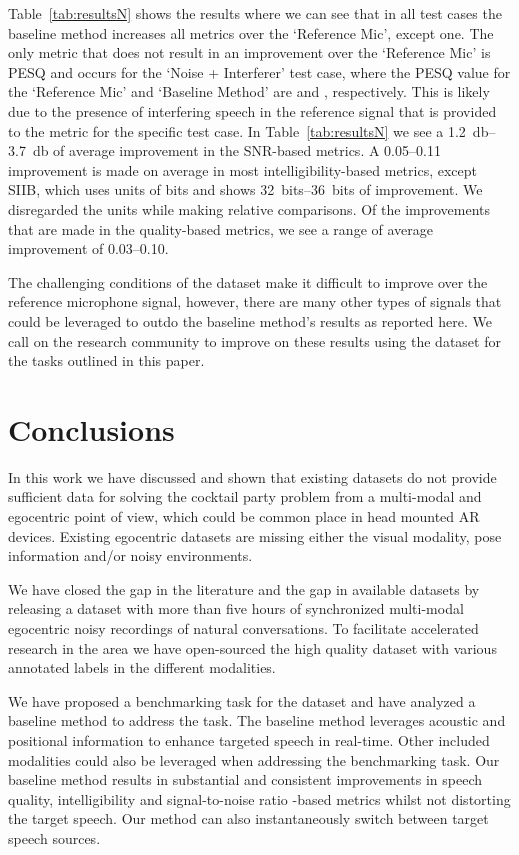 \documentclass[journal]{IEEEtran}
\begin{document}
\begin{table*}[htb!]
\begin{center}
\begin{tabular}
{{Table~\ref{tab:resultsN} shows the results where we can see that in all test cases the baseline method increases all metrics over the `Reference Mic', except one.
The only metric that does not result in an improvement over the `Reference Mic' is PESQ and occurs for the `Noise + Interferer' test case, where the PESQ value for the `Reference Mic' and `Baseline Method' are  and , respectively.
This is likely due to the presence of interfering speech in the reference signal that is provided to the metric for the specific test case.
In Table~\ref{tab:resultsN} we see a \SIrange{1.2}{3.7}{\decibel} of average improvement in the SNR-based metrics.
A \SIrange{0.05}{0.11}{} improvement is made on average in most intelligibility-based metrics, except SIIB, which uses units of bits and shows \SIrange{32}{36}{bits} of improvement. We disregarded the units while making relative comparisons.
Of the improvements that are made in the quality-based metrics, we see a range of average improvement of \SIrange{0.03}{0.10}{}.

The challenging conditions of the dataset make it difficult to improve over the reference microphone signal, however, there are many other types of signals that could be leveraged to outdo the baseline method's results as reported here.
We call on the research community to improve on these results using the dataset for the tasks outlined in this paper.

 

\section{Conclusions} \label{sec:Conclusions}
In this work we have discussed and shown that existing datasets do not provide sufficient data for solving the cocktail party problem from a multi-modal and egocentric point of view, which could be common place in head mounted AR devices.
Existing egocentric datasets are missing either the visual modality, pose information and/or noisy environments.

We have closed the gap in the literature and the gap in available datasets by releasing a dataset with more than five hours of synchronized multi-modal egocentric noisy recordings of natural conversations.
To facilitate accelerated research in the area we have open-sourced the high quality dataset with various annotated labels in the different modalities.


We have proposed a benchmarking task for the dataset and have analyzed a baseline method to address the task.
The baseline method leverages acoustic and positional information to enhance targeted speech in real-time.
Other included modalities could also be leveraged when addressing the benchmarking task.
Our baseline method results in substantial and consistent improvements in speech quality, intelligibility and signal-to-noise ratio -based metrics whilst not distorting the target speech.
Our method can also instantaneously switch between target speech sources.

}}
\end{tabular}
\end{center}
\end{table*}
\end{document}
